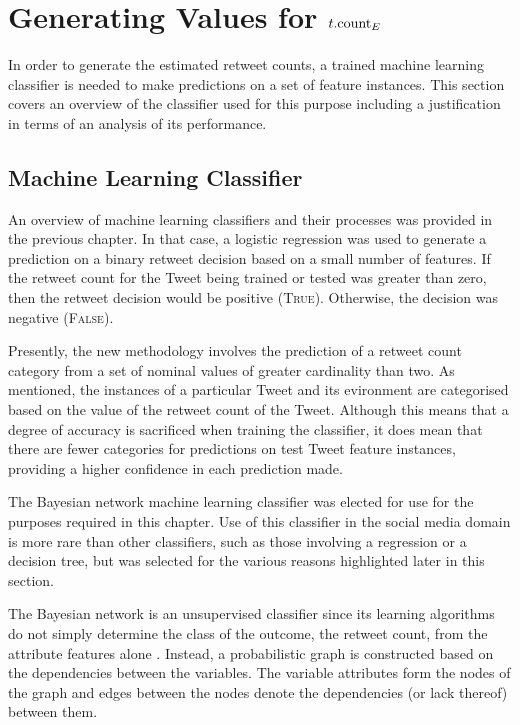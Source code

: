 \section{Generating Values for $t.\textrm{count}_E$}
In order to generate the estimated retweet counts, a trained machine learning classifier is needed to make predictions on a set of feature instances. This section covers an overview of the classifier used for this purpose including a justification in terms of an analysis of its performance.


\subsection{Machine Learning Classifier}
An overview of machine learning classifiers and their processes was provided in the previous chapter. In that case, a logistic regression was used to generate a prediction on a binary retweet decision based on a small number of features. If the retweet count for the Tweet being trained or tested was greater than zero, then the retweet decision would be positive (\textsc{True}). Otherwise, the decision was negative (\textsc{False}).

Presently, the new methodology involves the prediction of a retweet count category from a set of nominal values of greater cardinality than two. As mentioned, the instances of a particular Tweet and its evironment are categorised based on the value of the retweet count of the Tweet. Although this means that a degree of accuracy is sacrificed when training the classifier, it does mean that there are fewer categories for predictions on test Tweet feature instances, providing a higher confidence in each prediction made.

The Bayesian network machine learning classifier was elected for use for the purposes required in this chapter. Use of this classifier in the social media domain is more rare than other classifiers, such as those involving a regression or a decision tree, but was selected for the various reasons highlighted later in this section.

The Bayesian network is an unsupervised classifier since its learning algorithms do not simply determine the class of the outcome, the retweet count, from the attribute features alone \cite{friedman97}. Instead, a probabilistic graph is constructed based on the dependencies between the variables. The variable attributes form the nodes of the graph and edges between the nodes denote the dependencies (or lack thereof) between them.

